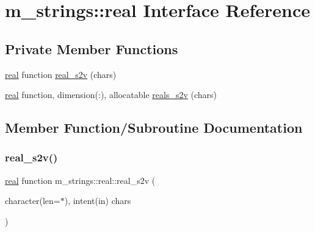 \hypertarget{interfacem__strings_1_1real}{}\section{m\+\_\+strings\+:\+:real Interface Reference}
\label{interfacem__strings_1_1real}
\subsection*{Private Member Functions}
\begin{DoxyCompactItemize}
\item 
\mbox{\hyperlink{interfacem__strings_1_1real}{real}} function \mbox{\hyperlink{interfacem__strings_1_1real_ae974a1258456ba67cad510359348e0fb}{real\+\_\+s2v}} (chars)
\item 
\mbox{\hyperlink{interfacem__strings_1_1real}{real}} function, dimension(\+:), allocatable \mbox{\hyperlink{interfacem__strings_1_1real_a27334a376c64d6b8807f01184f8524c9}{reals\+\_\+s2v}} (chars)
\end{DoxyCompactItemize}


\subsection{Member Function/\+Subroutine Documentation}
\mbox{\label{interfacem__strings_1_1real_ae974a1258456ba67cad510359348e0fb}} 
\subsubsection{\texorpdfstring{real\+\_\+s2v()}{real\_s2v()}}
{\footnotesize\ttfamily \mbox{\hyperlink{interfacem__strings_1_1real}{real}} function m\+\_\+strings\+::real\+::real\+\_\+s2v (\begin{DoxyParamCaption}\item[{character(len=$\ast$), intent(in)}]{chars }\end{DoxyParamCaption})\hspace{0.3cm}{\ttfamily [private]}}

\mbox{\label{interfacem__strings_1_1real_a27334a376c64d6b8807f01184f8524c9}} 
